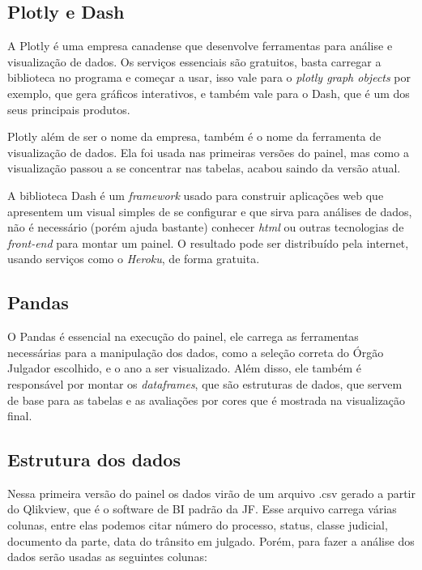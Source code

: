 \subsection{Plotly e Dash}

A Plotly é uma empresa canadense que desenvolve ferramentas para análise e visualização de dados. Os serviços essenciais são gratuitos, basta carregar a biblioteca no programa e começar a usar, isso vale para o \textit{plotly graph objects} por exemplo, que gera gráficos interativos, e também vale para o Dash, que é um dos seus principais produtos. 

Plotly além de ser o nome da empresa, também é o nome da ferramenta de visualização de dados. Ela foi usada nas primeiras versões do painel, mas como a visualização passou a se concentrar nas tabelas, acabou saindo da versão atual.

A biblioteca Dash é um \textit{framework} usado para construir aplicações web que apresentem um visual simples de se configurar e que sirva para análises de dados, não é necessário (porém ajuda bastante) conhecer \textit{html} ou outras tecnologias de \textit{front-end} para montar um painel. O resultado pode ser distribuído pela internet, usando serviços como o \textit{Heroku}, de forma gratuita.

\subsection{Pandas}

O Pandas é essencial na execução do painel, ele carrega as ferramentas necessárias para a manipulação dos dados, como a seleção correta do Órgão Julgador escolhido, e o ano a ser visualizado. Além disso, ele também é responsável por montar os \textit{dataframes}, que são estruturas de dados, que servem de base para as tabelas e as avaliações por cores que é mostrada na visualização final.

\subsection{Estrutura dos dados}

Nessa primeira versão do painel os dados virão de um arquivo .csv gerado a partir do Qlikview, que é o software de BI padrão da JF. Esse arquivo carrega várias colunas, entre elas podemos citar número do processo, status, classe judicial, documento da parte, data do trânsito em julgado. Porém, para fazer a análise dos dados serão usadas as seguintes colunas:

